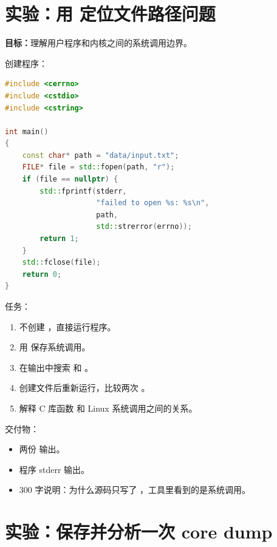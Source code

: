 \section{实验：用  定位文件路径问题}

\begin{labbox}
\textbf{目标：}理解用户程序和内核之间的系统调用边界。

创建程序：

\begin{lstlisting}[language=C++]
#include <cerrno>
#include <cstdio>
#include <cstring>

int main()
{
    const char* path = "data/input.txt";
    FILE* file = std::fopen(path, "r");
    if (file == nullptr) {
        std::fprintf(stderr,
                     "failed to open %s: %s\n",
                     path,
                     std::strerror(errno));
        return 1;
    }
    std::fclose(file);
    return 0;
}
\end{lstlisting}

任务：

\begin{enumerate}
  \item 不创建 ，直接运行程序。
  \item 用  保存系统调用。
  \item 在输出中搜索  和 。
  \item 创建文件后重新运行，比较两次 。
  \item 解释 C 库函数  和 Linux 系统调用之间的关系。
\end{enumerate}

交付物：

\begin{itemize}
  \item 两份  输出。
  \item 程序 stderr 输出。
  \item 300 字说明：为什么源码只写了 ，工具里看到的是系统调用。
\end{itemize}
\end{labbox}

\section{实验：保存并分析一次 core dump}

